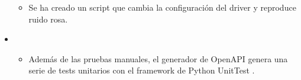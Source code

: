 \begin{itemize}
\begin{itemize}
		\item Se ha creado un script que cambia la configuración del driver y reproduce ruido rosa.
	\end{itemize}

	\item {}
	\begin{itemize}
		\item Además de las pruebas manuales, el generador de OpenAPI \cite{openapi} genera una serie de tests unitarios con el framework de Python UnitTest \cite{unittest}.
	\end{itemize}

\end{itemize}